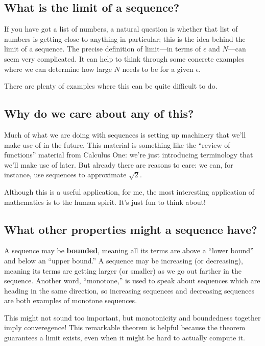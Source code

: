 \documentclass{ximera}
\begin{document}
\subsection{What is the limit of a sequence?}

If you have got a list of numbers, a natural question is whether that list of numbers is getting close to anything in particular; this is the idea behind the limit of a sequence.  The precise definition of limit---in terms of \(\epsilon\) and \(N\)---can seem very complicated.  It can help to think through some concrete examples where we can determine how large \(N\) needs to be for a given \(\epsilon\).

There are plenty of examples where this can be quite difficult to do.


\subsection{Why do we care about any of this?}

Much of what we are doing with sequences is setting up machinery that we'll make use of in the future.  This material is something like the ``review of functions'' material from Calculus One: we're just introducing terminology that we'll make use of later.  But already there are reasons to care: we can, for instance, use sequences to approximate \(\sqrt{2}\).


Although this is a useful application, for me, the most interesting application of mathematics is to the human spirit.  It's just fun to think about!

\subsection{What other properties might a sequence have?}

A sequence may be \textbf{bounded}, meaning all its terms are above a ``lower bound'' and below an
``upper bound.''  A sequence may be increasing (or decreasing), meaning its terms are getting larger (or smaller) as we go out farther in the sequence.  
Another word, ``monotone,'' is used to speak about sequences which are heading in the same direction, so increasing sequences and decreasing sequences are both examples of monotone sequences.

This might not sound too important, but monotonicity and boundedness together imply converegence!  This remarkable theorem is  helpful because the theorem guarantees a limit exists, even when it might be hard to actually compute it.
\end{document}
